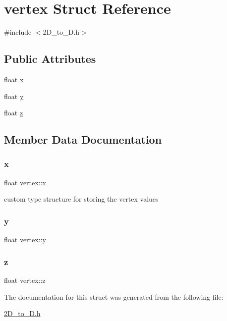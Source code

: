 \hypertarget{structvertex}{}\section{vertex Struct Reference}
\label{structvertex}


{\ttfamily \#include $<$2\+D\+\_\+to\+\_\+D.\+h$>$}

\subsection*{Public Attributes}
\begin{DoxyCompactItemize}
\item 
float \mbox{\hyperlink{structvertex_a664a5bbbbca4e1a99d85a163f6a08405}{x}}
\item 
float \mbox{\hyperlink{structvertex_aea3246afd0395032be285a49bcd4b146}{y}}
\item 
float \mbox{\hyperlink{structvertex_afe9862f7d3456ee2d352d94cbe5a84da}{z}}
\end{DoxyCompactItemize}


\subsection{Member Data Documentation}
\mbox{\label{structvertex_a664a5bbbbca4e1a99d85a163f6a08405}} 
\subsubsection{\texorpdfstring{x}{x}}
{\footnotesize\ttfamily float vertex\+::x}

custom type structure for storing the vertex values \mbox{\label{structvertex_aea3246afd0395032be285a49bcd4b146}} 
\subsubsection{\texorpdfstring{y}{y}}
{\footnotesize\ttfamily float vertex\+::y}

\mbox{\label{structvertex_afe9862f7d3456ee2d352d94cbe5a84da}} 
\subsubsection{\texorpdfstring{z}{z}}
{\footnotesize\ttfamily float vertex\+::z}



The documentation for this struct was generated from the following file\+:\begin{DoxyCompactItemize}
\item 
\mbox{\hyperlink{2_d__to__3_d_8h}{2\+D\+\_\+to\+\_\+D.\+h}}\end{DoxyCompactItemize}
